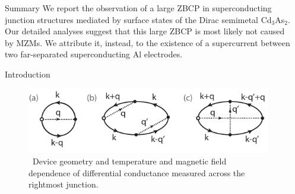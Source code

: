 \documentclass[final]{beamer}
\newlength{\sepwid}
\newlength{\onecolwid}
\begin{document}
\begin{frame}[t] %

\begin{columns}[t] %

\begin{column}{\sepwid}\end{column} %

\begin{column}{\onecolwid} %


\begin{alertblock}{Summary}
We report the observation of a large ZBCP in superconducting junction structures mediated by 
surface states of the Dirac semimetal Cd$_3$As$_2$. Our detailed analyses
suggest that this large ZBCP is most likely not caused by MZMs. We attribute it,
instead, to the existence of a supercurrent between two far-separated
superconducting Al electrodes.
\end{alertblock}


\begin{block}{Introduction}



\begin{figure}
\includegraphics[width=\linewidth]{fig/diagram-figure.pdf}
\caption{\sffamily \, Device geometry and temperature and magnetic field dependence
	of differential conductance measured across the rightmost junction.}
\label{fig:exp}
\end{figure}


\end{block}
\end{column}
\end{columns}
\end{frame}
\end{document}
